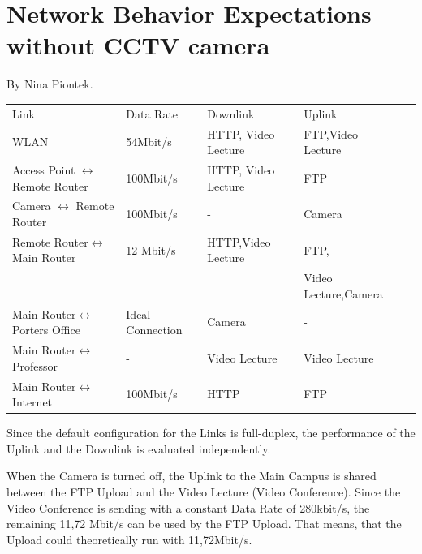 \documentclass[a4paper,10pt]{book}\usepackage{graphicx}
\begin{document}
\section{Network Behavior  Expectations without CCTV camera}
By Nina Piontek.\\

\begin{minipage}[t]{0.5\textwidth}
\begin{tabular}{|l|l|l|l|l|}
\cline{1-4}
 Link & Data Rate  & Downlink  & Uplink  \\ \cline{1-4}
 WLAN & 54Mbit/s  & HTTP, Video Lecture & FTP,Video Lecture \\ \cline{1-4}
 Access Point $\leftrightarrow$ Remote Router & 100Mbit/s  &HTTP, Video Lecture& FTP  \\ \cline{1-4}
 Camera $\leftrightarrow$ Remote Router & 100Mbit/s  & - & Camera\\ \cline{1-4}
 Remote Router$\leftrightarrow$Main Router&12 Mbit/s&HTTP,Video Lecture& FTP, \\ 
 & & & Video Lecture,Camera \\ \cline{1-4}
 Main Router$\leftrightarrow $ Porters Office &Ideal Connection &Camera& - \\ \cline{1-4}
 Main Router$\leftrightarrow $ Professor & -  &Video Lecture&Video Lecture \\ \cline{1-4}
 Main Router$\leftrightarrow $ Internet &100Mbit/s &HTTP& FTP \\ \cline{1-4}
\end{tabular}
\end{minipage}

Since the default configuration for the Links is full-duplex, the performance of the Uplink and the Downlink is evaluated independently.
\par When the Camera is turned off, the Uplink to the Main Campus is shared between the FTP Upload and the Video Lecture (Video Conference).
Since the Video Conference is sending with a constant Data Rate of 280kbit/s, the remaining 
11,72 Mbit/s can be used by the FTP Upload. That means, that the Upload could theoretically run with 11,72Mbit/s.
\end{document}
